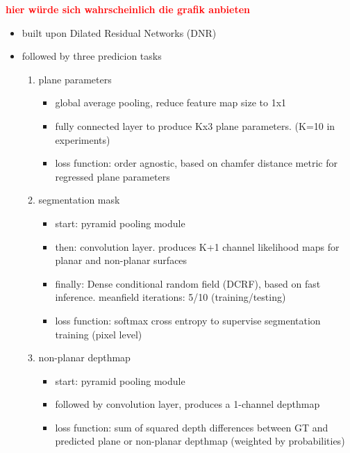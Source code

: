\documentclass[main.tex]{subfiles}
\begin{document}
\textbf{\textcolor{red}{hier würde sich wahrscheinlich die grafik anbieten}}
\begin{itemize}
    \item built upon Dilated Residual Networks (DNR)
    \item followed by three predicion tasks
          \begin{enumerate}
              \item plane parameters
                    \begin{itemize}
                        \item global average pooling, reduce feature map size to 1x1
                        \item fully connected layer to produce Kx3 plane parameters. (K=10 in experiments)
                        \item loss function: order agnostic, based on chamfer distance metric for regressed plane parameters
                    \end{itemize}
              \item segmentation mask
                    \begin{itemize}
                        \item start: pyramid pooling module
                        \item then: convolution layer. produces K+1 channel likelihood maps for planar and non-planar surfaces
                        \item finally: Dense conditional random field (DCRF), based on fast inference. meanfield iterations: 5/10 (training/testing)
                        \item loss function: softmax cross entropy to supervise segmentation training (pixel level)
                    \end{itemize}
              \item non-planar depthmap
                    \begin{itemize}
                        \item start: pyramid pooling module
                        \item followed by convolution layer, produces a 1-channel depthmap
                        \item loss function: sum of squared depth differences between GT and predicted plane or non-planar
                              depthmap (weighted by probabilities)
                    \end{itemize}
          \end{enumerate}
\end{itemize}
\end{document}
